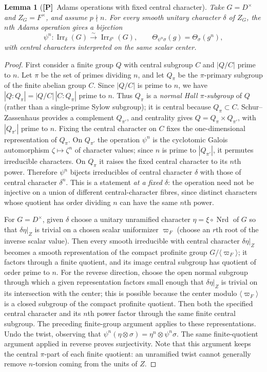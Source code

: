 \documentclass[11pt]{article}
\newcommand{\Nrd}{\operatorname{Nrd}}
\newcommand{\Irr}{\operatorname{Irr}}
\newcommand{\Ptag}{\textnormal{\textbf{[P]}}}
\theoremstyle{plain}
\newtheorem{lemma}[theorem]{Lemma}
\theoremstyle{definition}
\begin{document}
\begin{lemma}[\Ptag\ Adams operations with fixed central character]\label{lem:tame-adams}
Take $G=D^\times$ and $Z_G=F^\times$, and assume $p\nmid n$.
For every smooth unitary character $\delta$ of $Z_G$, the
$n$th Adams operation gives a bijection
\[
\psi^n:\Irr_\delta(G)\xrightarrow{\sim}
\Irr_{\delta^n}(G),\qquad
\Theta_{\psi^n\sigma}(g)=\Theta_\sigma(g^n),
\]
with central characters interpreted on the same scalar center.
\end{lemma}
\begin{proof}
First consider a finite group $Q$ with central subgroup $C$
and $|Q/C|$ prime to $n$. Let $\pi$ be the set of primes dividing $n$, and let $Q_\pi$
be the $\pi$-primary subgroup of the finite abelian group $C$.
Since $|Q/C|$ is prime to $n$, we have
$|Q:Q_\pi|=|Q/C|\,|C:Q_\pi|$ prime to $n$.
Thus $Q_\pi$ is a \emph{normal Hall $\pi$-subgroup} of $Q$
(rather than a single-prime Sylow subgroup);
it is central because $Q_\pi\subset C$. Schur--Zassenhaus
provides a complement $Q_{\pi'}$, and centrality gives
$Q=Q_\pi\times Q_{\pi'}$, with $|Q_{\pi'}|$ prime to $n$.
Fixing the central character on $C$ fixes the one-dimensional
representation of $Q_\pi$.
On $Q_{\pi'}$ the operation $\psi^n$ is the cyclotomic Galois
automorphism $\zeta\mapsto\zeta^n$ of character values; since
$n$ is prime to $|Q_{\pi'}|$, it permutes irreducible characters.
On $Q_\pi$ it raises the fixed central character to its $n$th
power. Therefore $\psi^n$ bijects irreducibles of central
character $\delta$ with those of central character $\delta^n$.
This is a statement \emph{at a fixed $\delta$}: the operation
need not be injective on a union of different central-character
fibres, since distinct characters whose quotient has order dividing
$n$ can have the same $n$th power.

For $G=D^\times$, given $\delta$ choose a unitary unramified
character $\eta=\xi\circ\Nrd$ of $G$ so that
$\delta\eta|_Z$ is trivial on a chosen scalar uniformizer
$\varpi_F$ (choose an $r$th root of the inverse scalar value).
Then every smooth irreducible with central character $\delta\eta|_Z$
becomes a smooth representation of the compact profinite group
$G/\langle\varpi_F\rangle$; it factors through a finite quotient,
and its image central subgroup has quotient of order prime to
$n$. For the reverse direction, choose the open normal subgroup
through which a given representation factors small enough that
$\delta\eta|_Z$ is trivial on its intersection with the center;
this is possible because the center modulo $\langle\varpi_F\rangle$
is a closed subgroup of the compact profinite quotient.
Then both the specified central character and its $n$th power
factor through the same finite central subgroup. The preceding
finite-group argument applies to these representations.
Undo the twist, observing that
$\psi^n(\eta\otimes\sigma)=\eta^n\otimes\psi^n\sigma$.
The same finite-quotient argument applied in reverse proves
surjectivity. Note that this argument keeps the central
$\pi$-part of each finite quotient: an unramified twist cannot
generally remove $n$-torsion coming from the units of $Z$.
\end{proof}
\end{document}
